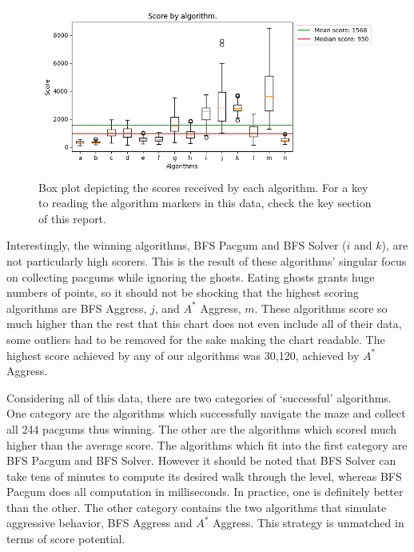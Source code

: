 \documentclass[12pt]{article}
\begin{document}
    \begin{figure}[H]
      \begin{center}
        \includegraphics[width = .885\linewidth]{../../graphs/score.png}
        \captionsetup{width = .885\linewidth}
        \caption{Box plot depicting the scores received by each algorithm. For a key to reading the algorithm markers in this data, check the key section of this report.}
      \end{center}
    \end{figure}
    Interestingly, the winning algorithms, BFS Pacgum and BFS Solver ($i$ and $k$), are not particularly high scorers. This is the result of these algorithms' singular focus on collecting pacgums while ignoring the ghosts. Eating ghosts grants huge numbers of points, so it should not be shocking that the highest scoring algorithms are BFS Aggress, $j$, and $A^*$ Aggress, $m$. These algorithms score so much higher than the rest that this chart does not even include all of their data, some outliers had to be removed for the sake making the chart readable. The highest score achieved by any of our algorithms was 30,120, achieved by $A^*$ Aggress.

    Considering all of this data, there are two categories of `successful' algorithms. One category are the algorithms which successfully navigate the maze and collect all 244 pacgums thus winning. The other are the algorithms which scored much higher than the average score.  The algorithms which fit into the first category are BFS Pacgum and BFS Solver. However it should be noted that BFS Solver can take tens of minutes to compute its desired walk through the level, whereas BFS Pacgum does all computation in milliseconds. In practice, one is definitely better than the other. The other category contains the two algorithms that simulate aggressive behavior, BFS Aggress and $A^*$ Aggress. This strategy is unmatched in terms of score potential.
\end{document}
